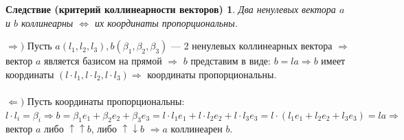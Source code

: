 \newtheorem*{cor2_2}{Следствие (критерий коллинеарности векторов)}\begin{cor2_2}Два ненулевых вектора $a$ и $b$ коллинеарны $\Longleftrightarrow$ их координаты пропорциональны.
\end{cor2_2}\begin{Proof}
	$\Rightarrow)$ Пусть $a(l_1, l_2, l_3), b(\beta_1, \beta_2, \beta_3)$ --- 2 ненулевых коллинеарных вектора $\Rightarrow$ вектор 
	$a$ является
	базисом на прямой $\Rightarrow$ $b$ представим в виде: $b = la \Rightarrow b$ имеет координаты $(l\cdot l_1, l\cdot l_2, l\cdot l_3)\Rightarrow$
	координаты пропорциональны.\\\\
	$\Leftarrow)$ Пусть координаты пропорциональны: $l\cdot l_i = \beta_i \Rightarrow b = \beta_1e_1 + \beta_2e_2 + \beta_3 e_3 = l\cdot l_1 e_1 + l\cdot l_2 e_2 + l\cdot l_3 e_3 =
	l\cdot(l_1e_1 + l_2e_2 + l_3e_3) = la \Rightarrow$ вектор $a$ либо $\uparrow \uparrow b$, либо $\uparrow\downarrow b$ $\Rightarrow a$ коллинеарен $b$.
\end{Proof}


